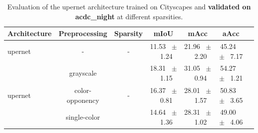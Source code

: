\begin{table}[h]
  \centering
  \caption{Evaluation of the upernet architecture trained on Cityscapes and \textbf{validated on acdc_night} at different sparsities.}
  \begin{tabular}{@{}lccc ccc@{}}
    \toprule
    Architecture & Preprocessing & Sparsity & mIoU & mAcc & aAcc \\
    \midrule
    upernet & - & - & 11.53 ~$\pm$~ 1.24 & 21.96 ~$\pm$~ 2.20 & 45.24 ~$\pm$~ 7.17 \\
    \midrule
    \midrule
    \multirow{3}{*}{upernet} & grayscale & \multirow{3}{*}{-} & 18.31 ~$\pm$~ 1.15 & 31.05 ~$\pm$~ 0.94 & 54.27 ~$\pm$~ 1.21 \\
    & color-opponency & & 16.37 ~$\pm$~ 0.81 & 28.01 ~$\pm$~ 1.57 & 50.83 ~$\pm$~ 3.65 \\
    & single-color & & 14.64 ~$\pm$~ 1.36 & 28.31 ~$\pm$~ 1.02 & 49.00 ~$\pm$~ 4.06 \\
    \midrule
    \bottomrule
  \end{tabular}
  \label{tab:sparse_upernet_acdc_night}
\end{table}